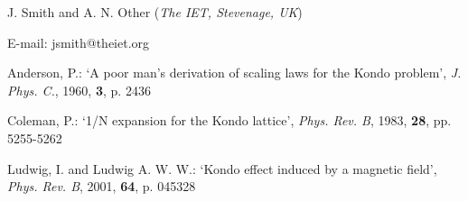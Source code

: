 \documentclass[twocolumn]{el-author}
\begin{document}
\vskip5pt

\noindent J. Smith and A. N. Other (\textit{The IET, Stevenage, UK})
\vskip3pt

\noindent E-mail: jsmith@theiet.org

\begin{thebibliography}{}

Anderson, P.: `A poor man's derivation of scaling laws for the Kondo problem', \textit{J. Phys. C.}, 1960, \textbf{3}, p. 2436

Coleman, P.: `1/N expansion for the Kondo lattice', \textit{Phys. Rev. B}, 1983, \textbf{28}, pp. 5255-5262

Ludwig, I. and Ludwig A. W. W.: `Kondo effect induced by a magnetic field', \textit{Phys. Rev. B}, 2001, \textbf{64}, p. 045328

\end{thebibliography}
\end{document}
